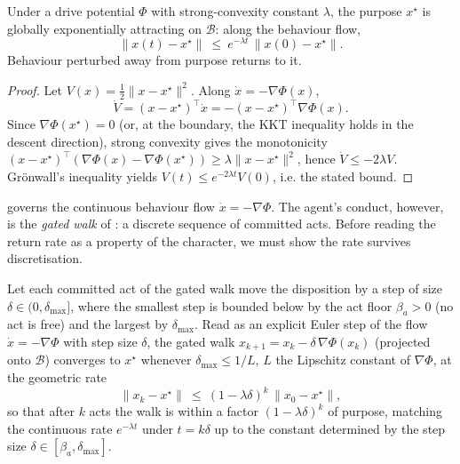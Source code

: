 \documentclass[11pt,twocolumn,a4paper]{article}
\newcommand{\floorc}{\beta}          %
\newcommand{\Beh}{\mathcal{B}}       %
\newcommand{\norm}[1]{\lVert#1\rVert}
\begin{document}
\begin{theorem}
\label{thm:attractor}
Under a drive potential $\Phi$ with strong-convexity constant $\lambda$,
the purpose $x^\star$ is globally exponentially attracting on $\Beh$:
along the behaviour flow,
\[
\norm{x(t)-x^\star}\ \le\ e^{-\lambda t}\,\norm{x(0)-x^\star}.
\]
Behaviour perturbed away from purpose returns to it.
\end{theorem}

\begin{proof}
Let $V(x)=\tfrac12\norm{x-x^\star}^2$. Along $\dot x=-\nabla\Phi(x)$,
\[
\dot V=(x-x^\star)^\top\dot x=-(x-x^\star)^\top\nabla\Phi(x).
\]
Since $\nabla\Phi(x^\star)=0$ (or, at the boundary, the KKT inequality
holds in the descent direction), strong convexity gives the monotonicity
$(x-x^\star)^\top(\nabla\Phi(x)-\nabla\Phi(x^\star))\ge\lambda\norm{x-
x^\star}^2$, hence $\dot V\le-2\lambda V$. Grönwall's inequality yields
$V(t)\le e^{-2\lambda t}V(0)$, i.e. the stated bound.
\end{proof}

 governs the continuous behaviour flow $\dot
x=-\nabla\Phi$. The agent's conduct, however, is the \emph{gated walk} of
: a discrete sequence of committed acts. Before reading
the return rate as a property of the character, we must show the rate
survives discretisation.

\begin{lemma}
\label{lem:discretise}
Let each committed act of the gated walk move the disposition by a step of
size $\delta\in(0,\delta_{\max}]$, where the smallest step is bounded below
by the act floor $\floorc_a>0$ (no act is free) and the largest by
$\delta_{\max}$. Read as an explicit Euler step of the flow $\dot
x=-\nabla\Phi$ with step size $\delta$, the gated walk
$x_{k+1}=x_k-\delta\,\nabla\Phi(x_k)$ (projected onto $\Beh$) converges to
$x^\star$ whenever $\delta_{\max}\le 1/L$, $L$ the Lipschitz constant of
$\nabla\Phi$, at the geometric rate
\[
\norm{x_k-x^\star}\ \le\ (1-\lambda\delta)^{k}\,\norm{x_0-x^\star},
\]
so that after $k$ acts the walk is within a factor $(1-\lambda\delta)^k$ of
purpose, matching the continuous rate $e^{-\lambda t}$ under $t=k\delta$ up
to the constant determined by the step size $\delta\in[\floorc_a,
\delta_{\max}]$.
\end{lemma}
\end{document}
